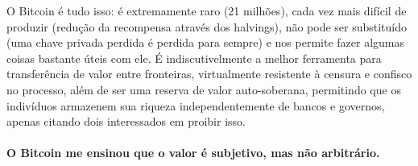 O Bitcoin é tudo isso: é extremamente raro (21 milhões), cada vez mais difícil de produzir (redução da recompensa através dos halvings), não pode ser substituído (uma chave privada perdida é perdida para sempre) e nos permite fazer algumas coisas bastante úteis com ele. É indiscutivelmente a melhor ferramenta para transferência de valor entre fronteiras, virtualmente resistente à censura e confisco no processo, além de ser uma reserva de valor auto-soberana, permitindo que os indivíduos armazenem sua riqueza independentemente de bancos e governos, apenas citando dois interessados em proibir isso.

\paragraph{O Bitcoin me ensinou que o valor é subjetivo, mas não arbitrário.}

%
%
%
%
